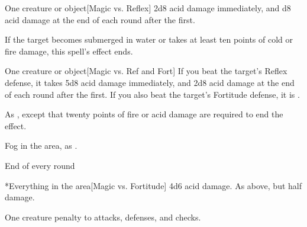 \spellrng{\rngmed}
\begin{spelltarget}{One creature or object}[Magic vs. Reflex]
    \spellsuccess 2d8 acid damage immediately, and d8 acid damage at the end of each round after the first.
\end{spelltarget}
\spellnotes If the target becomes submerged in water or takes at least ten points of cold or fire damage, this spell's effect ends.

\spellrng{\rngfar}
\begin{spelltarget}{One creature or object}[Magic vs. Ref and Fort]
    \spellsuccess If you beat the target's Reflex defense, it takes 5d8 acid damage immediately, and 2d8 acid damage at the end of each round after the first. If you also beat the target's Fortitude defense, it is \vulnerable.
\end{spelltarget}
\spellnotes As , except that twenty points of fire or acid damage are required to end the effect.

\spelldur{\durshort}
\spellline
\spelleffect Fog in the area, as .
\begin{spelltrigger}{End of every round}
    \begin{spelltarget}*{Everything in the area}[Magic vs. Fortitude]
        \spellsuccess 4d6 acid damage.
        \spellfailure As above, but half damage.
    \end{spelltarget}
\end{spelltrigger}
\spellnotes \fogspellnotes

\spellrng{\rngmed}
\spelldur{\durshort}
\begin{spelltarget}{One creature}
    \spelleffect {} penalty to attacks, defenses, and checks.
\end{spelltarget}

